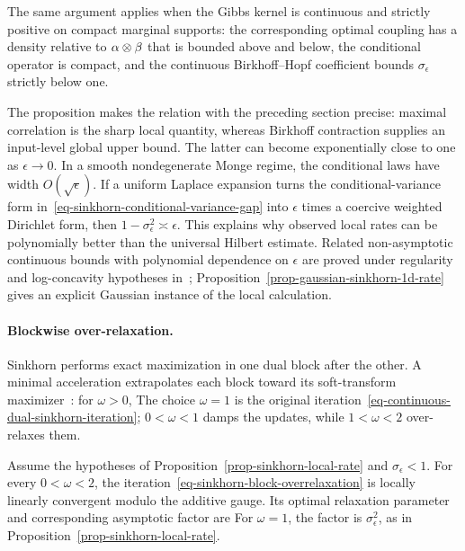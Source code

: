 The same argument applies when the Gibbs kernel is continuous and strictly positive on compact marginal supports: the corresponding optimal coupling has a density relative to $\alpha\otimes\beta$ that is bounded above and below, the conditional operator is compact, and the continuous Birkhoff--Hopf coefficient bounds $\sigma_\epsilon$ strictly below one.

The proposition makes the relation with the preceding section precise: maximal correlation is the sharp local quantity, whereas Birkhoff contraction supplies an input-level global upper bound. The latter can become exponentially close to one as $\epsilon\to0$. In a smooth nondegenerate Monge regime, the conditional laws have width $O(\sqrt\epsilon)$. If a uniform Laplace expansion turns the conditional-variance form in~\eqref{eq-sinkhorn-conditional-variance-gap} into $\epsilon$ times a coercive weighted Dirichlet form, then
\(
	1-\sigma_\epsilon^2\asymp\epsilon.
\)
This explains why observed local rates can be polynomially better than the universal Hilbert estimate. Related non-asymptotic continuous bounds with polynomial dependence on $\epsilon$ are proved under regularity and log-concavity hypotheses in~\cite{chizat2024sharper}; Proposition~\ref{prop-gaussian-sinkhorn-1d-rate} gives an explicit Gaussian instance of the local calculation.

\paragraph{Blockwise over-relaxation.}

Sinkhorn performs exact maximization in one dual block after the other. A minimal acceleration extrapolates each block toward its soft-transform maximizer~\cite{thibault2021overrelaxed,lehmann2022overrelaxation}: for $\omega>0$,
The choice $\omega=1$ is the original iteration~\eqref{eq-continuous-dual-sinkhorn-iteration}; $0<\omega<1$ damps the updates, while $1<\omega<2$ over-relaxes them.

\begin{prop}\label{prop-sinkhorn-optimal-overrelaxation}
	Assume the hypotheses of Proposition~\ref{prop-sinkhorn-local-rate} and $\sigma_\epsilon<1$. For every $0<\omega<2$, the iteration~\eqref{eq-sinkhorn-block-overrelaxation} is locally linearly convergent modulo the additive gauge. Its optimal relaxation parameter and corresponding asymptotic factor are
	For $\omega=1$, the factor is $\sigma_\epsilon^2$, as in Proposition~\ref{prop-sinkhorn-local-rate}.
\end{prop}

